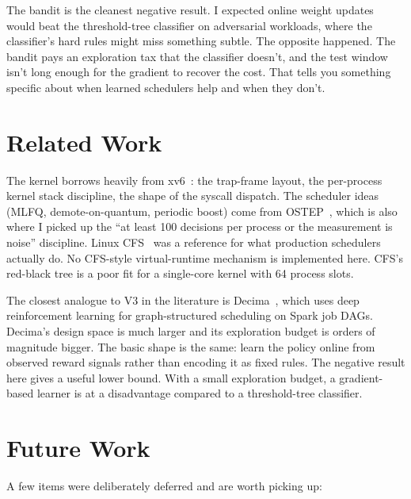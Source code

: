 \documentclass[11pt]{article}
\begin{document}
The bandit is the cleanest negative result. I expected online weight
updates would beat the threshold-tree classifier on adversarial workloads,
where the classifier's hard rules might miss something subtle. The
opposite happened. The bandit pays an exploration tax that the classifier
doesn't, and the test window isn't long enough for the gradient to recover
the cost. That tells you something specific about when learned schedulers
help and when they don't.

\section{Related Work}
\label{sec:related}

The kernel borrows heavily from xv6~\cite{xv6}: the trap-frame layout, the
per-process kernel stack discipline, the shape of the syscall dispatch.
The scheduler ideas (MLFQ, demote-on-quantum, periodic boost) come from
OSTEP~\cite{ostep}, which is also where I picked up the ``at least 100
decisions per process or the measurement is noise'' discipline. Linux
CFS~\cite{cfs} was a reference for what production schedulers actually do.
No CFS-style virtual-runtime mechanism is implemented here. CFS's
red-black tree is a poor fit for a single-core kernel with 64 process
slots.

The closest analogue to V3 in the literature is Decima~\cite{decima}, which
uses deep reinforcement learning for graph-structured scheduling on Spark
job DAGs. Decima's design space is much larger and its exploration budget
is orders of magnitude bigger. The basic shape is the same: learn the
policy online from observed reward signals rather than encoding it as fixed
rules. The negative result here gives a useful lower bound. With a small
exploration budget, a gradient-based learner is at a disadvantage compared
to a threshold-tree classifier.

\section{Future Work}
\label{sec:future}

A few items were deliberately deferred and are worth picking up:
\end{document}
